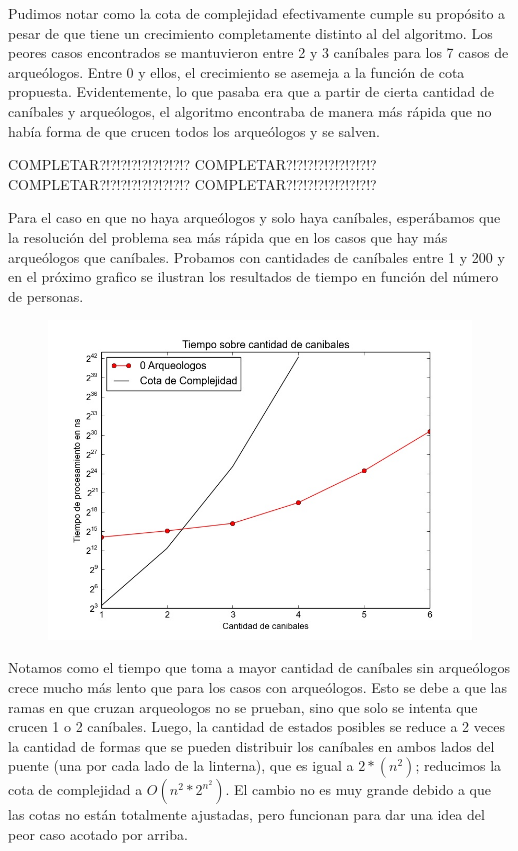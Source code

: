   Pudimos notar como la cota de complejidad efectivamente cumple su propósito a pesar de que tiene un crecimiento completamente distinto al del algoritmo. Los peores casos encontrados se mantuvieron entre 2 y 3 caníbales para los 7 casos de arqueólogos. Entre 0 y ellos, el crecimiento se asemeja a la función de cota propuesta.
  Evidentemente, lo que pasaba era que a partir de cierta cantidad de caníbales y arqueólogos, el algoritmo encontraba de manera más rápida que no había forma de que crucen todos los arqueólogos y se salven.

  COMPLETAR?!?!?!?!?!?!?!?!?
  COMPLETAR?!?!?!?!?!?!?!?!?
  COMPLETAR?!?!?!?!?!?!?!?!?
  COMPLETAR?!?!?!?!?!?!?!?!?

  Para el caso en que no haya arqueólogos y solo haya caníbales, esperábamos que la resolución del problema sea más rápida que en los casos que hay más arqueólogos que caníbales. Probamos con cantidades de caníbales entre 1 y 200 y en el próximo grafico se ilustran los resultados de tiempo en función del número de personas.

  \begin{figure}[H]
      \begin{center}
        \includegraphics[width=0.7\columnwidth]{imagenes/ej1exp2NuevaVersion.jpeg}
        \caption{}
      \end{center}
  \end{figure}

  Notamos como el tiempo que toma a mayor cantidad de caníbales sin arqueólogos crece mucho más lento que para los casos con arqueólogos. Esto se debe a que las ramas en que cruzan arqueologos no se prueban, sino que solo se intenta que crucen 1 o 2 caníbales. Luego, la cantidad de estados posibles se reduce a 2 veces la cantidad de formas que se pueden distribuir los caníbales en ambos lados del puente (una por cada lado de la linterna), que es igual a $2*(n^2)$; reducimos la cota de complejidad a $O(n^2*2^{n^2})$. El cambio no es muy grande debido a que las cotas no están totalmente ajustadas, pero funcionan para dar una idea del peor caso acotado por arriba.
